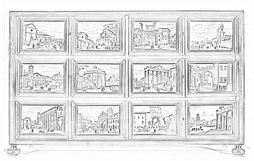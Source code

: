 \documentclass[hidelinks,12pt,a4paper]{article}
\begin{document}
\begin{adjustwidth}{-30mm}{-30mm}
			\thispagestyle{empty}
			\begin{minipage}{0.91\linewidth}
				\centering
				\includegraphics[scale=0.9]{Vedute_di_Roma_1.jpg}
			\end{minipage}
			
			\vspace*{\fill}
			\newpage
			

\end{adjustwidth}
\end{document}
